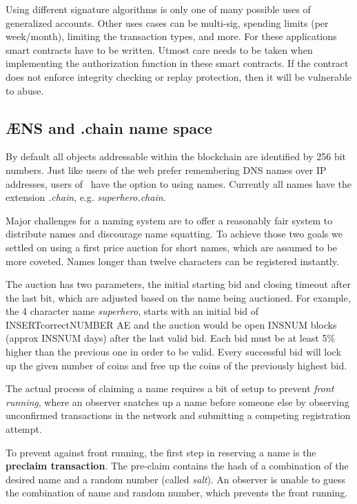Using different signature algorithms is only one of many possible uses
of generalized accounts. Other uses cases can be multi-sig, spending
limits (per week/month), limiting the transaction types, and more. For
these applications smart contracts have to be written. Utmost care
needs to be taken when implementing the authorization
function in these smart contracts. If the contract does not enforce
integrity checking or replay protection, then it will be vulnerable to
abuse.



\subsection{ÆNS and .chain name space}
\label{sect:aens}

By default all objects addressable within the blockchain are identified by
256 bit numbers. Just like users of the web prefer remembering DNS names over
IP addresses, users of \aet\ have the option to using names. Currently all
names have the extension \textit{.chain}, e.g. \textit{superhero.chain}.

Major challenges for a naming system are to offer a reasonably fair system to
distribute names and discourage name squatting. To achieve those two goals we
settled on using a first price auction for short names, which are assumed to be
more coveted. Names longer than twelve characters can be registered instantly.

The auction has two parameters, the initial starting bid and closing timeout
after the last bit, which are adjusted based on the name being auctioned.
For example, the 4 character name \textit{superhero}, starts with an initial
bid of INSERTcorrectNUMBER AE and the auction would be open INSNUM blocks (approx INSNUM
days) after the last valid bid.
Each bid must be at least 5\% higher than the previous one in order to be
valid. Every successful bid will lock up the given number of coins and free
up the coins of the previously highest bid.

The actual process of claiming a name requires a bit of setup to prevent
\textit{front running}, where an observer snatches up a name before someone
else by observing unconfirmed transactions in the network and submitting a
competing registration attempt.

To prevent against front running, the first step in reserving a name is the
\textbf{preclaim transaction}. The pre-claim contains the hash of a combination
of the desired name and a random number (called \textit{salt}). An observer is
unable to guess the combination of name and random number, which prevents the
front running.

